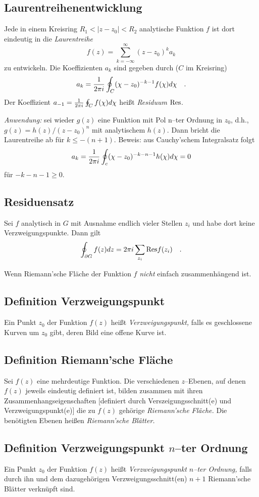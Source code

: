  \subsection{Laurentreihenentwicklung}
 Jede in einem Kreisring $R_1< \vert z-z_0\vert <R_2$ analytische
 Funktion $f$ ist dort eindeutig in die {\em Laurentreihe}
 $$f(z)=\sum_{k=-\infty}^\infty (z-z_0)^k a_k$$
 zu entwickeln. Die Koeffizienten $a_k$ sind gegeben durch
 ($C$ im Kreisring)
 $$a_k={1\over 2\pi i}\oint_C (\chi -z_0)^{-k-1}f(\chi ) d\chi \quad.$$
 Der Koeffizient $a_{-1}={1\over 2\pi i}\oint_Cf(\chi )d\chi $ hei\ss t
{\em Residuum}
 ${\rm Res}$.

{\em Anwendung:} sei wieder $g(z)$ eine Funktion mit Pol n--ter Ordnung
 in $z_0$, d.h.,
 $g(z)= {h(z)/ (z-z_0)^n}$
 mit analytischem $h(z)$. Dann bricht die Laurentreihe ab
 f\"ur $k\le -(n+1)$. Beweis: aus Cauchy'schem Integralsatz folgt
 $$a_k ={1\over 2\pi i}\oint_c(\chi -z_0)^{-k-n-1}h(\chi )d\chi =0$$
 f\"ur $-k-n-1\ge 0$.


 \subsection{Residuensatz}
 Sei $f$ analytisch in $G$ mit Ausnahme endlich vieler Stellen $z_i$
 und habe dort keine Verzweigungspunkte. Dann gilt
 $$\oint_{\partial G} f(z)dz=2\pi i \sum_{z_i} {\rm Res}f(z_i)\quad .$$




 Wenn Riemann'sche Fl\"ache der
 Funktion $f$ {\em nicht} einfach zusammenh\"angend ist.


 \subsection{Definition Verzweigungspunkt}
 Ein Punkt $z_0$ der Funktion $f(z)$ hei\ss t {\em Verzweigungspunkt,}
 falls es geschlossene Kurven um $z_0$ gibt, deren Bild eine offene
 Kurve ist.


 \subsection{Definition Riemann'sche Fl\"ache}
 Sei $f(z)$ eine mehrdeutige Funktion.
 Die verschiedenen $z$--Ebenen, auf denen $f(z)$ jeweils eindeutig
 definiert ist, bilden zusammen mit ihren Zusammenhangseigenschaften
 [definiert durch Verszeigungsschnitt(e) und Verzweigungspunkt(e)]
 die zu $f(z)$ geh\"orige {\em Riemann'sche Fl\"ache.}
 Die ben\"otigten Ebenen hei\ss en {\em Riemann'sche Bl\"atter.}


 \subsection{Definition Verzweigungspunkt $n$--ter Ordnung}
 Ein Punkt $z_0$ der Funktion $f(z)$ hei\ss t {\em Verzweigungspunkt
 $n$--ter Ordnung,} falls durch ihn und dem dazugeh\"origen
 Verzweigungsschnitt(en) $n+1$ Riemann'sche Bl\"atter verkn\"upft sind.


 
